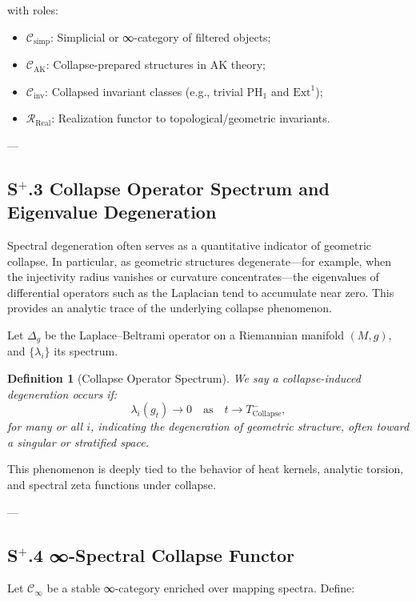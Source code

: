 \documentclass[11pt]{article}
\newtheorem{definition}[theorem]{Definition}
\begin{document}
with roles:

\begin{itemize}
    \item $\mathcal{C}_{\mathrm{simp}}$: Simplicial or ∞-category of filtered objects;
    \item $\mathcal{C}_{\mathrm{AK}}$: Collapse-prepared structures in AK theory;
    \item $\mathcal{C}_{\mathrm{inv}}$: Collapsed invariant classes (e.g., trivial $\mathrm{PH}_1$ and $\mathrm{Ext}^1$);
    \item $\mathcal{R}_{\mathrm{Real}}$: Realization functor to topological/geometric invariants.
\end{itemize}

---

\subsection*{S$^{+}$.3 Collapse Operator Spectrum and Eigenvalue Degeneration}

Spectral degeneration often serves as a quantitative indicator of geometric collapse. In particular, as geometric structures degenerate—for example, when the injectivity radius vanishes or curvature concentrates—the eigenvalues of differential operators such as the Laplacian tend to accumulate near zero. This provides an analytic trace of the underlying collapse phenomenon.

Let \( \Delta_g \) be the Laplace–Beltrami operator on a Riemannian manifold \( (M, g) \), and \( \{ \lambda_i \} \) its spectrum.

\begin{definition}[Collapse Operator Spectrum]
We say a collapse-induced degeneration occurs if:
\[
\lambda_i(g_t) \longrightarrow 0 \quad \text{as} \quad t \to T_{\mathrm{Collapse}}^-,
\]
for many or all \( i \), indicating the degeneration of geometric structure, often toward a singular or stratified space.
\end{definition}

This phenomenon is deeply tied to the behavior of heat kernels, analytic torsion, and spectral zeta functions under collapse.

---

\subsection*{S$^{+}$.4 ∞-Spectral Collapse Functor}

Let \( \mathcal{C}_\infty \) be a stable ∞-category enriched over mapping spectra. Define:
\end{document}
